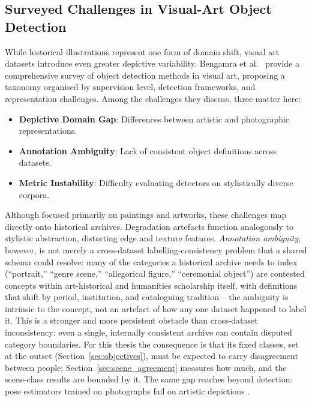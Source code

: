 \documentclass[12pt,a4paper]{report}
\begin{document}
\subsection{Surveyed Challenges in Visual-Art Object Detection}
\label{sec:annotation_ambiguity_note}
While historical illustrations represent one form of domain shift, visual art datasets introduce even greater depictive variability. Bengamra et al.~\cite{bengamra2024survey_visualart_od} provide a comprehensive survey of object detection methods in visual art, proposing a taxonomy organised by supervision level, detection frameworks, and representation challenges. Among the challenges they discuss, three matter here:

\begin{itemize}
    \item \textbf{Depictive Domain Gap}: Differences between artistic and photographic representations.
    \item \textbf{Annotation Ambiguity}: Lack of consistent object definitions across datasets.
    \item \textbf{Metric Instability}: Difficulty evaluating detectors on stylistically diverse corpora.
\end{itemize}

Although focused primarily on paintings and artworks, these challenges map directly onto historical archives. Degradation artefacts function analogously to stylistic abstraction, distorting edge and texture features. \textit{Annotation ambiguity}, however, is not merely a cross-dataset labelling-consistency problem that a shared schema could resolve: many of the categories a historical archive needs to index (``portrait,'' ``genre scene,'' ``allegorical figure,'' ``ceremonial object'') are contested concepts within art-historical and humanities scholarship itself, with definitions that shift by period, institution, and cataloguing tradition -- the ambiguity is intrinsic to the concept, not an artefact of how any one dataset happened to label it. This is a stronger and more persistent obstacle than cross-dataset inconsistency: even a single, internally consistent archive can contain disputed category boundaries. For this thesis the consequence is that its fixed classes, set at the outset (Section~\ref{sec:objectives}), must be expected to carry disagreement between people; Section~\ref{sec:scene_agreement} measures how much, and the scene-class results are bounded by it. The same gap reaches beyond detection: pose estimators trained on photographs fail on artistic depictions \cite{schneider_vollmer_2024_popia}.
\end{document}
